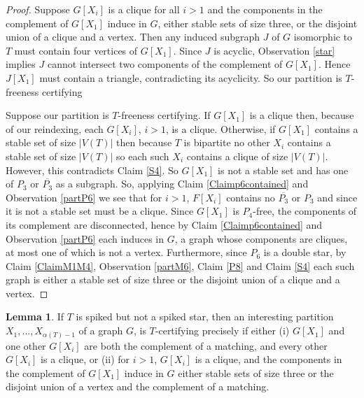 \documentclass[12pt]{article}
\theoremstyle{definition}
\newtheorem{lemma}[theorem]{Lemma}
\begin{document}
\begin{proof}
Suppose $G[X_i]$ is a clique  for all $i>1$ and  the components in the complement of  $G[X_1]$ induce in $G$, either stable sets of size three, or the disjoint union of a clique and a vertex.   Then any induced subgraph $J$  of $G$
isomorphic to $T$ must contain four vertices of $G[X_1]$. Since $J$ is acyclic, Observation \ref{star} implies 
$J$ cannot  intersect two components  of the complement of $G[X_1]$.
Hence $J[X_1]$  must contain a triangle, contradicting its acyclicity. So our partition is $T$-freeness certifying

Suppose our partition is $T$-freeness certifying. 
If $G[X_1]$ is a clique then, because of our reindexing, each $G[X_i]$, $i>1$, is a clique.
Otherwise, if $G[X_1]$ contains a stable set of size $|V(T)|$  then because $T$ is bipartite no other $X_i$ contains a 
stable set of size $|V(T)|$ so each such $X_i$ contains a clique of size $|V(T)|$. However, this contradicts Claim \ref{S4}. So $G[X_1]$  is not a stable set and  has one of $P_3$ or $\overline{P_3}$ as a subgraph.
So,  applying Claim \ref{Claimp6contained} and Observation \ref{partP6} we see that for $i>1$, $F[X_i]$
contains no $\overline{P_3}$ or $P_3$ and since it is not a stable set must be  a clique. Since $G[X_1]$ is $P_4$-free, the components of its complement are disconnected, hence by Claim \ref{Claimp6contained} and Observation \ref{partP6} each induces in $G$, a graph whose components are cliques, at most one of which is not a vertex. Furthermore, since $P_6$ is a double star, by Claim \ref{ClaimM1M4}, Observation \ref{partM6}, Claim \ref{P8} and Claim \ref{S4} each such graph is  either a stable set of size three or the disjoint union
of a clique and a vertex. 
\end{proof}


\begin{lemma}\label{stns}
If  $T$  is spiked but  not a spiked star, then an interesting  partition $X_1,...,X_{\alpha(T)-1}$  of a graph $G$, is $T$-certifying 
precisely if either (i) $G[X_1]$ and one other $G[X_i]$ are both  the complement of a matching, and every other $G[X_i]$ is a clique,
 or (ii) for $i>1$, $G[X_i]$ is a clique, and the components in the 
complement of $G[X_1]$  induce in $G$  either stable sets of size three or the disjoint union of a vertex and the complement of a matching. 
\end{lemma}
\end{document}
